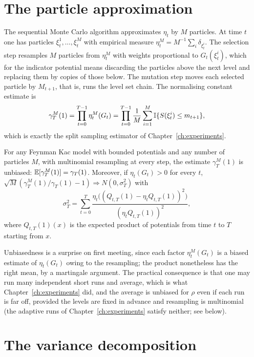 \section{The particle approximation}

The sequential Monte Carlo algorithm approximates $\eta_t$ by $M$ particles. At time $t$ one has particles $\xi_t^1, \dots, \xi_t^M$ with empirical measure $\eta_t^M = M^{-1} \sum_i \delta_{\xi_t^i}$. The selection step resamples $M$ particles from $\eta_t^M$ with weights proportional to $G_t(\xi_t^i)$, which for the indicator potential means discarding the particles above the next level and replacing them by copies of those below. The mutation step moves each selected particle by $M_{t+1}$, that is, runs the level set chain. The normalising constant estimate is
\[
\gamma_T^M(1) = \prod_{t=0}^{T-1} \eta_t^M(G_t) = \prod_{t=0}^{T-1} \frac{1}{M} \sum_{i=1}^{M} \mathbb{I}\{ S(\xi_t^i) \le m_{t+1} \} ,
\]
which is exactly the split sampling estimator of Chapter~\ref{ch:experiments}.

\begin{theorem}
For any Feynman Kac model with bounded potentials and any number of particles $M$, with multinomial resampling at every step, the estimate $\gamma_T^M(1)$ is unbiased: $\mathbb{E}[\gamma_T^M(1)] = \gamma_T(1)$. Moreover, if $\eta_t(G_t) > 0$ for every $t$, $\sqrt M (\gamma_T^M(1) / \gamma_T(1) - 1) \Rightarrow N(0, \sigma_T^2)$ with
\[
\sigma_T^2 = \sum_{t=0}^{T} \frac{ \eta_t\big( (Q_{t, T}(1) - \eta_t Q_{t,T}(1))^2 \big) }{ (\eta_t Q_{t,T}(1))^2 } ,
\]
where $Q_{t, T}(1)(x)$ is the expected product of potentials from time $t$ to $T$ starting from $x$.
\end{theorem}

Unbiasedness is a surprise on first meeting, since each factor $\eta_t^M(G_t)$ is a biased estimate of $\eta_t(G_t)$ owing to the resampling; the product nonetheless has the right mean, by a martingale argument. The practical consequence is that one may run many independent short runs and average, which is what Chapter~\ref{ch:experiments} did, and the average is unbiased for $\rho$ even if each run is far off, provided the levels are fixed in advance and resampling is multinomial (the adaptive runs of Chapter~\ref{ch:experiments} satisfy neither; see below).

\section{The variance decomposition}

